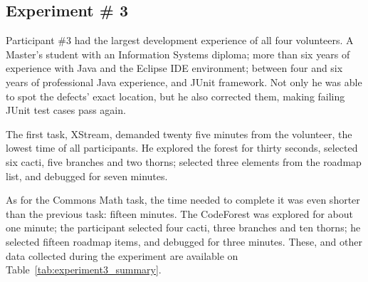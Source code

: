 \subsection{Experiment \# 3}

Participant \#3 had the largest development experience of all four volunteers. A
Master's student with an Information Systems diploma; more than six years of
experience with Java and the Eclipse IDE environment; between four and six years
of professional Java experience, and  JUnit framework. Not only he was able to spot the
defects' exact location, but he also corrected them, making failing JUnit
test cases pass again.

The first task, XStream, demanded twenty five minutes from the volunteer, the
lowest time of all participants. He explored the forest for thirty seconds,
selected six cacti, five branches and two thorns; selected three elements from
the roadmap list, and debugged for seven minutes.

As for the Commons Math task, the time needed to complete it was even shorter
than the previous task: fifteen minutes.
The CodeForest was explored for about one minute; the participant selected four
cacti, three branches and ten thorns; he selected fifteen roadmap items, and
debugged for three minutes. These, and other data collected during the
experiment are available on Table~\ref{tab:experiment3_summary}.

